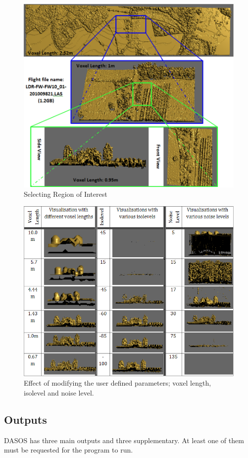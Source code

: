\documentclass{subfiles}
\begin{document}
			\begin{figure} [h!]
				\centering
				\includegraphics[width=.65\textwidth]{tex/Appendices/img/SelectingRegionOfInterest}
				\caption{Selecting Region of Interest}
				\label{fig:SelectingRegionOfInterest}
			\end{figure}			
			\begin{figure} [h!]
				\centering
				\includegraphics[width=.85\textwidth]{tex/Appendices/img/DASOS}
				\caption{Effect of modifying the user defined parameters; voxel length, isolevel and noise level.}
				\label{fig:DASOS}
			\end{figure}	
		
			
			\newpage
		
		\subsection{Outputs}\label{output}
		
		
			\par DASOS has three main outputs and three supplementary. At least one of them must be requested for the program to run. 
			
\end{document}
